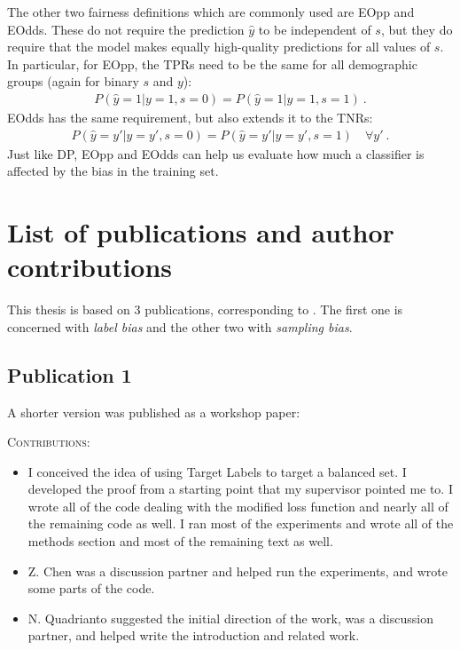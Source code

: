 The other two fairness definitions which are commonly used are \ac{EOpp} and \ac{EOdds}.
These do not require the prediction $\hat{y}$ to be independent of $s$,
but they do require that the model makes equally high-quality predictions for all values of $s$.
In particular, for \ac{EOpp}, the \acp{TPR} need to be the same for all demographic groups
(again for binary $s$ and $y$):
\begin{align}
  \label{eq:eopp-def}
  P(\hat{y}=1|y=1,s=0) = P(\hat{y}=1|y=1,s=1)~.
\end{align}
\ac{EOdds} has the same requirement, but also extends it to the \acp{TNR}:
\begin{align}
  P(\hat{y}=y'|y=y',s=0) = P(\hat{y}=y'|y=y',s=1)\quad\forall y'~.
  \label{eq:eodds-def}
\end{align}
Just like \ac{DP},
\ac{EOpp} and \ac{EOdds} can help us evaluate how much a classifier is affected by the bias in the training set.

\section{List of publications and author contributions}%
\label{sec:claims-contributions}
This thesis is based on 3 publications, corresponding to .
The first one is concerned with \emph{label bias} and the other two with \emph{sampling bias}.

\subsection{Publication 1}
\begin{refsection}[allreferences]
    \nocite{kehrenberg2020tuning}
    \printbibliography[heading=none]
\end{refsection}
\noindent A shorter version was published as a workshop paper:
\begin{refsection}[allreferences]
    \nocite{kehrenberg2018interpretable}
    \printbibliography[heading=none]
\end{refsection}
\noindent\textsc{Contributions:}
\begin{itemize}
  \item I conceived the idea of using Target Labels to target a balanced set. I developed the proof from a starting point that my supervisor pointed me to. I wrote all of the code dealing with the modified loss function and nearly all of the remaining code as well. I ran most of the experiments and wrote all of the methods section and most of the remaining text as well.
  \item Z. Chen was a discussion partner and helped run the experiments, and wrote some parts of the code.
  \item N. Quadrianto suggested the initial direction of the work, was a discussion partner, and helped write the introduction and related work.
\end{itemize}

